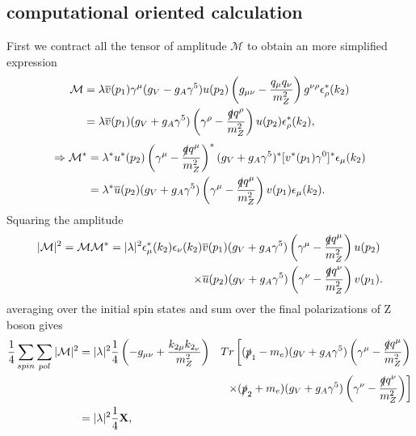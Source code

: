 \documentclass{report}
\newcommand{\nn}{\nonumber}
\numberwithin{equation}{section}
\begin{document}
\subsection{computational oriented calculation}
First we contract all the tensor of amplitude $\mathcal{M}$ to obtain an more simplified expression
\begin{equation}
\begin{split}
    \mathcal{M}&=\lambda \overline{v}(p_1) \gamma^\mu (g_V-g_A \gamma^5) u(p_2) \left(g_{\mu \nu}-\frac{q_\mu q_\nu}{m_Z^2}\right) g^{\nu \rho}\epsilon_\rho^*(k_2)\\
    &=\lambda\overline{v}(p_1) (g_V+g_A \gamma^5) \left(\gamma^\rho-\frac{\slashed{q} q^\rho}{m_Z^2}\right) u(p_2)  \epsilon_\rho^*(k_2),\\
    \end{split}
\end{equation}
\begin{equation}
\begin{split}
\Rightarrow	\mathcal{M}^*	&=\lambda^* u^*(p_2) \left(\gamma^\mu-\frac{\slashed{q} q^\mu}{m_Z^2}\right)^* (g_V+g_A \gamma^5)^* [v^*(p_1)\gamma^0]^*  \epsilon_\mu(k_2)\\
		&=\lambda^*\overline{u}(p_2) (g_V+g_A \gamma^5)\left(\gamma^\mu-\frac{\slashed{q} q^\mu}{m_Z^2}\right) v(p_1)  \epsilon_\mu(k_2).
\end{split}
\end{equation}
Squaring the amplitude 
\begin{equation}
\begin{split}
|\mathcal{M}|^2=\mathcal{M}\mathcal{M}^*=|\lambda|^2\epsilon_\mu^*(k_2) \epsilon_\nu(k_2)&\overline{v}(p_1) (g_V+g_A \gamma^5) \left(\gamma^\mu-\frac{\slashed{q} q^\mu}{m_Z^2}\right) u(p_2)\\\times &\overline{u}(p_2) (g_V+g_A \gamma^5)\left(\gamma^\nu-\frac{\slashed{q} q^\nu}{m_Z^2}\right) v(p_1)  .
\end{split}
\end{equation}
averaging over the initial spin states and sum over the final polarizations of Z boson gives
\begin{align}
\frac{1}{4}\sum_{spin} \sum_{pol} |\mathcal{M}|^2&=|\lambda|^2\frac{1}{4}\left(-g_{\mu \nu}+\frac{k_{2\mu}k_{2_\nu}}{m_Z^2}\right)&Tr\left[(\slashed{p}_1-m_e)(g_V+g_A \gamma^5) \left(\gamma^\mu-\frac{\slashed{q} q^\mu}{m_Z^2}\right)\right.\nn \\
 &&\left.\times (\slashed{p}_2+m_e) (g_V+g_A \gamma^5)\left(\gamma^\nu-\frac{\slashed{q} q^\nu}{m_Z^2}\right) \right]\nn\\
&=|\lambda|^2\frac{1}{4}\textbf{X}\label{20},
\end{align}
\end{document}
